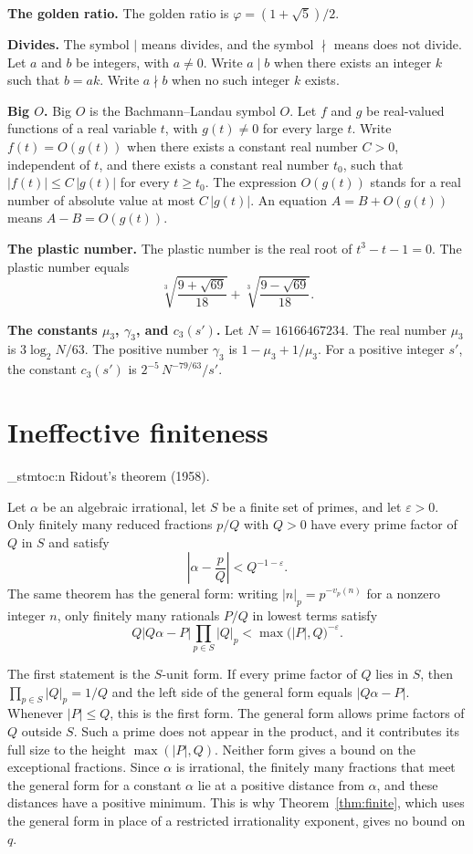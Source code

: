 \documentclass[11pt]{article}
\newenvironment{named}[1]{%
  \par\addvspace{\medskipamount}%
  \pagebreak[3]%
  \noindent{\bfseries #1}\space\ignorespaces
  \stmtoc{#1}%
}{\par\addvspace{\medskipamount}}
\newcommand{\topic}[1]{\par\noindent\textbf{#1}}
\newcommand{\stmtoc}[1]{ \qn_stmtoc:n {#1} }
\begin{document}
\topic{The golden ratio.}
The golden ratio is $\varphi = (1 + \sqrt{5})/2$.

\topic{Divides.}
The symbol $\mid$ means divides, and the symbol $\nmid$ means does not divide.
Let $a$ and $b$ be integers, with $a \ne 0$.
Write $a \mid b$ when there exists an integer $k$ such that $b = ak$.
Write $a \nmid b$ when no such integer $k$ exists.

\topic{Big $O$.}
Big $O$ is the Bachmann--Landau symbol $O$.
Let $f$ and $g$ be real-valued functions of a real variable $t$, with $g(t) \ne 0$ for every large $t$.
Write $f(t) = O(g(t))$ when there exists a constant real number $C > 0$, independent of $t$, and there exists a constant real number $t_0$, such that $|f(t)| \le C\,|g(t)|$ for every $t \ge t_0$.
The expression $O(g(t))$ stands for a real number of absolute value at most $C\,|g(t)|$.
An equation $A = B + O(g(t))$ means $A - B = O(g(t))$.

\topic{The plastic number.}
The plastic number is the real root of $t^3 - t - 1 = 0$.
The plastic number equals
\[
\sqrt[3]{\frac{9 + \sqrt{69}}{18}} + \sqrt[3]{\frac{9 - \sqrt{69}}{18}}.
\]

\topic{The constants $\mu_3$, $\gamma_3$, and $c_3(s')$.}
Let $N = 16166467234$.
The real number $\mu_3$ is $3\log_2 N/63$.
The positive number $\gamma_3$ is $1 - \mu_3 + 1/\mu_3$.
For a positive integer $s'$, the constant $c_3(s')$ is $2^{-5}\, N^{-79/63}/s'$.

\section{Ineffective finiteness}
\label{sec:ineffective}

\begin{named}{Ridout's theorem (1958).}
Let $\alpha$ be an algebraic irrational, let $S$ be a finite set of primes, and let $\varepsilon > 0$.
Only finitely many reduced fractions $p/Q$ with $Q > 0$ have every prime factor of $Q$ in $S$ and satisfy
\[
\left| \alpha - \frac{p}{Q} \right| < Q^{-1-\varepsilon}.
\]
The same theorem has the general form: writing $\lvert n \rvert_p = p^{-v_p(n)}$ for a nonzero integer $n$, only finitely many rationals $P/Q$ in lowest terms satisfy
\[
Q \bigl| Q\alpha - P \bigr| \prod_{p \in S} \lvert Q \rvert_p < \max\bigl(\lvert P \rvert, Q\bigr)^{-\varepsilon}.
\]
\end{named}

The first statement is the $S$-unit form.
If every prime factor of $Q$ lies in $S$, then $\prod_{p \in S} \lvert Q \rvert_p = 1/Q$ and the left side of the general form equals $\lvert Q\alpha - P \rvert$.
Whenever $\lvert P \rvert \le Q$, this is the first form.
The general form allows prime factors of $Q$ outside $S$.
Such a prime does not appear in the product, and it contributes its full size to the height $\max(\lvert P \rvert, Q)$.
Neither form gives a bound on the exceptional fractions.
Since $\alpha$ is irrational, the finitely many fractions that meet the general form for a constant $\alpha$ lie at a positive distance from $\alpha$, and these distances have a positive minimum.
This is why Theorem~\ref{thm:finite}, which uses the general form in place of a restricted irrationality exponent, gives no bound on $q$.
\end{document}

